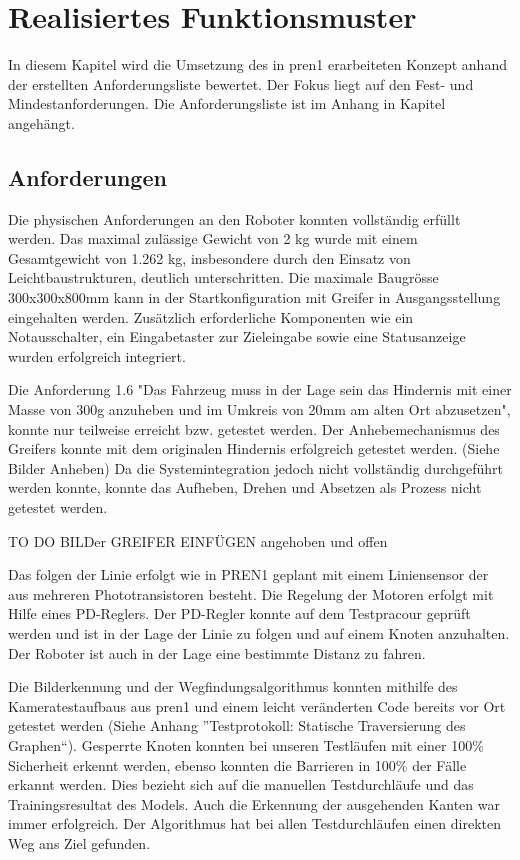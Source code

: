 \section{Realisiertes Funktionsmuster}

In diesem Kapitel wird die Umsetzung des in \acrshort{pren1} erarbeiteten Konzept anhand der  erstellten Anforderungsliste bewertet. Der Fokus liegt auf den Fest- und Mindestanforderungen. Die Anforderungsliste ist im Anhang in Kapitel  angehängt.

\subsection{Anforderungen}

Die physischen Anforderungen an den Roboter konnten vollständig erfüllt werden. Das maximal zulässige Gewicht von 2 kg wurde mit einem Gesamtgewicht von 1.262 kg, insbesondere durch den Einsatz von Leichtbaustrukturen, deutlich unterschritten. Die maximale Baugrösse 300x300x800mm kann in der Startkonfiguration mit Greifer in Ausgangsstellung eingehalten werden. Zusätzlich erforderliche Komponenten wie ein Notausschalter, ein Eingabetaster zur Zieleingabe sowie eine Statusanzeige wurden erfolgreich integriert.

Die Anforderung 1.6 "Das Fahrzeug muss in der Lage sein das Hindernis mit  einer Masse von 300g anzuheben und im Umkreis von 20mm am alten Ort abzusetzen", konnte nur teilweise erreicht bzw. getestet werden. Der Anhebemechanismus des Greifers konnte mit dem originalen Hindernis erfolgreich getestet werden. (Siehe Bilder Anheben) Da die Systemintegration jedoch nicht vollständig durchgeführt werden konnte, konnte das Aufheben, Drehen und Absetzen als Prozess nicht getestet werden.

TO DO BILDer GREIFER EINFÜGEN angehoben und offen

Das folgen der Linie erfolgt wie in PREN1 geplant mit einem Liniensensor der aus mehreren Phototransistoren besteht. Die Regelung der Motoren erfolgt mit Hilfe eines PD-Reglers. Der PD-Regler konnte auf dem Testpracour geprüft werden und ist in der Lage der Linie zu folgen und auf einem Knoten anzuhalten. Der Roboter ist auch in der Lage eine bestimmte Distanz zu fahren.

Die Bilderkennung und der Wegfindungsalgorithmus  konnten mithilfe des Kameratestaufbaus aus \acrshort{pren1} und einem leicht veränderten Code bereits vor Ort getestet werden (Siehe Anhang ''Testprotokoll: Statische Traversierung des Graphen``). Gesperrte Knoten konnten bei unseren Testläufen mit einer 100\% Sicherheit erkennt werden, ebenso konnten die Barrieren in 100\% der Fälle erkannt werden. Dies bezieht sich auf die manuellen Testdurchläufe und das Trainingsresultat des Models. Auch die Erkennung der ausgehenden Kanten war immer erfolgreich. Der Algorithmus hat bei allen Testdurchläufen einen direkten Weg ans Ziel gefunden. 

